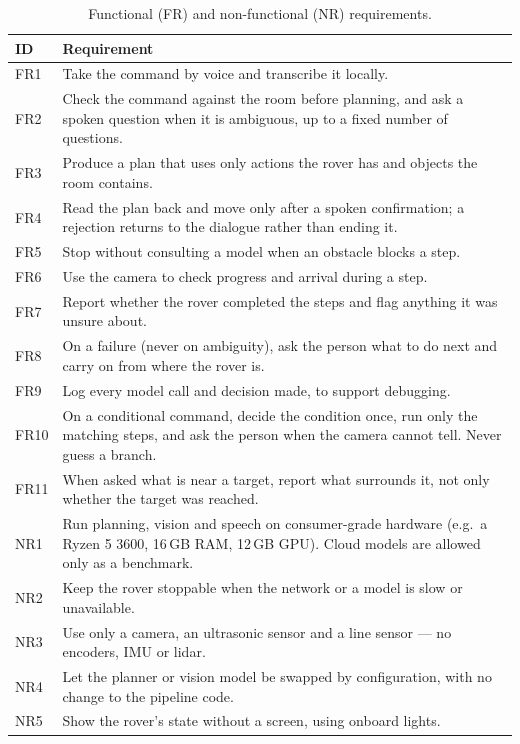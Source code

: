 \begin{table}[htbp]
  \centering
  \caption{Functional (FR) and non-functional (NR) requirements.}
  \label{tab:requirements}
  \small
  \begin{tabular}{@{}l p{10.8cm}@{}}
    \toprule
    ID & Requirement \\
    \midrule
    FR1 & Take the command by voice and transcribe it locally. \\
    FR2 & Check the command against the room before planning, and ask a spoken question when it is ambiguous, up to a fixed number of questions. \\
    FR3 & Produce a plan that uses only actions the rover has and objects the room contains. \\
    FR4 & Read the plan back and move only after a spoken confirmation; a rejection returns to the dialogue rather than ending it. \\
    FR5 & Stop without consulting a model when an obstacle blocks a step. \\
    FR6 & Use the camera to check progress and arrival during a step. \\
    FR7 & Report whether the rover completed the steps and flag anything it was unsure about. \\
    FR8 & On a failure (never on ambiguity), ask the person what to do next and carry on from where the rover is. \\
    FR9 & Log every model call and decision made, to support debugging. \\
    FR10 & On a conditional command, decide the condition once, run only the matching steps, and ask the person when the camera cannot tell. Never guess a branch. \\
    FR11 & When asked what is near a target, report what surrounds it, not only whether the target was reached. \\
    NR1 & Run planning, vision and speech on consumer-grade hardware (e.g.\ a Ryzen 5 3600, 16\,GB RAM, 12\,GB GPU). Cloud models are allowed only as a benchmark. \\
    NR2 & Keep the rover stoppable when the network or a model is slow or unavailable. \\
    NR3 & Use only a camera, an ultrasonic sensor and a line sensor — no encoders, IMU or lidar. \\
    NR4 & Let the planner or vision model be swapped by configuration, with no change to the pipeline code. \\
    NR5 & Show the rover's state without a screen, using onboard lights. \\
    \bottomrule
  \end{tabular}
\end{table}


